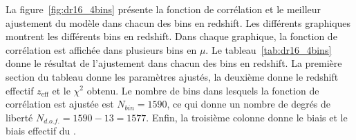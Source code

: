 \documentclass[11pt, twoside, a4paper, openright]{report}
\begin{document}
La figure~\ref{fig:dr16_4bins} présente la fonction de corrélation et le meilleur ajustement du modèle dans chacun des bins en redshift. Les différents graphiques montrent les différents bins en redshift. Dans chaque graphique, la fonction de corrélation est affichée dans plusieurs bins en $\mu$. Le tableau~\ref{tab:dr16_4bins} donne le résultat de l'ajustement dans chacun des bins en redshift. La première section du tableau donne les paramètres ajustés, la deuxième donne le redshift effectif $z_{\mathrm{eff}}$ et le $\chi^2$ obtenu. Le nombre de bins dans lesquels la fonction de corrélation est ajustée est $N_{bin} = \num{1590}$, ce qui donne un nombre de degrés de liberté $N_{d.o.f.} = \num{1590} - \num{13} = \num{1577}$. Enfin, la troisième colonne donne le biais et le biais effectif du \lya{}.
\end{document}
